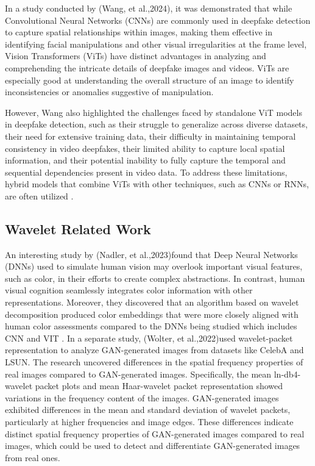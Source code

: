 \documentclass{svproc}
\begin{document}
In a study conducted by (Wang, et al.,2024), it was demonstrated that while Convolutional Neural Networks (CNNs) are commonly used in deepfake detection to capture spatial relationships within images, making them effective in identifying facial manipulations and other visual irregularities at the frame level, Vision Transformers (ViTs) have distinct advantages in analyzing and comprehending the intricate details of deepfake images and videos. ViTs are especially good at understanding the overall structure of an image to identify inconsistencies or anomalies suggestive of manipulation\cite {wang2024timely}.


However, Wang also highlighted the challenges faced by standalone ViT models in deepfake detection, such as their struggle to generalize across diverse datasets, their need for extensive training data, their difficulty in maintaining temporal consistency in video deepfakes, their limited ability to capture local spatial information, and their potential inability to fully capture the temporal and sequential dependencies present in video data. To address these limitations, hybrid models that combine ViTs with other techniques, such as CNNs or RNNs, are often utilized \cite {wang2024timely}.

\subsection{Wavelet Related Work}
An interesting study by (Nadler, et al.,2023)found that Deep Neural Networks (DNNs) used to simulate human vision may overlook important visual features, such as color, in their efforts to create complex abstractions. In contrast, human visual cognition seamlessly integrates color information with other representations. Moreover, they discovered that an algorithm based on wavelet decomposition produced color embeddings that were more closely aligned with human color assessments compared to the DNNs being studied which includes CNN and VIT \cite {nadler2023divergences}.
In a separate study, (Wolter, et al.,2022)used wavelet-packet representation to analyze GAN-generated images from datasets like CelebA and LSUN. The research uncovered differences in the spatial frequency properties of real images compared to GAN-generated images. Specifically, the mean ln-db4-wavelet packet plots and mean Haar-wavelet packet representation showed variations in the frequency content of the images. GAN-generated images exhibited differences in the mean and standard deviation of wavelet packets, particularly at higher frequencies and image edges. These differences indicate distinct spatial frequency properties of GAN-generated images compared to real images, which could be used to detect and differentiate GAN-generated images from real ones. \cite {wolter2022wavelet}
\end{document}
